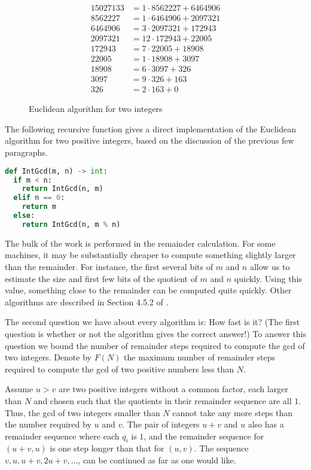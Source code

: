 \begin{figure}
\[
\begin{aligned}
  15027133 &= 1 \cdot 8562227 + 6464906\\
  8562227  &= 1 \cdot 6464906 + 2097321\\
  6464906  &= 3 \cdot 2097321 + 172943\\
  2097321  &= 12 \cdot 172943  + 22005\\
  172943   &= 7 \cdot 22005   + 18908\\
  22005    &= 1 \cdot 18908   + 3097\\
  18908    &= 6 \cdot 3097    + 326\\
  3097     &= 9 \cdot 326     + 163\\
  326      &= 2 \cdot 163     + 0
\end{aligned}
\]
\caption{Euclidean algorithm for two integers\label{Int:Euclid:Alg:Fig}}
\end{figure}


The following recursive function gives a direct implementation of the
Euclidean algorithm for two positive integers, based on the discussion
of the previous few paragraphs.

\begin{lstlisting}[language=Python]
def IntGcd(m, n) -> int:
  if m < n:
    return IntGcd(n, m)
  elif n == 0:
    return m
  else:
    return IntGcd(n, m % n)
\end{lstlisting}

The bulk of the work is performed in the remainder calculation.  For
some machines, it may be substantially cheaper to compute something
slightly larger than the remainder.  For instance, the first several
bits of $m$ and $n$ allow us to estimate the size and first few bits
of the quotient of $m$ and $n$ quickly.  Using this value, something
close to the remainder can be computed quite quickly.  Other
algorithms are described in Section 4.5.2 of {\Knuth} \cite{Knuth:II}.

The second question we have about every algorithm is: How fast is it?
(The first question is whether or not the algorithm gives the correct
answer!)  To answer this question we bound the number of remainder
steps required 
to compute the {\sc gcd} of two integers.  Denote by $F(N)$ the
maximum number of 
remainder steps required to compute the {\sc gcd} of two positive
numbers less than $N$.

Assume $u > v$ are two positive integers without a common factor, each
larger than $N$ and chosen such that the quotients in their remainder
sequence are all $1$.  Thus, the {\sc gcd} of two integers smaller
than $N$ cannot take any more steps than the number required by $u$
and $v$.  The pair of integers $u+v$ and $u$ also has a remainder
sequence where each $q_i$ is $1$, and the remainder sequence for
$(u+v, u)$ is one step longer than that for $(u, v)$.  The sequence
$v, u, u+v, 2u+v,
\ldots$, can be continued as far as one would like.

